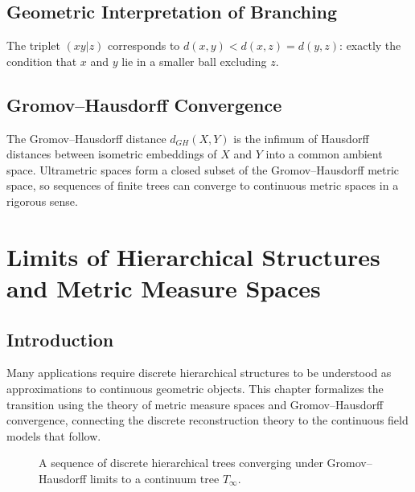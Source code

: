 \documentclass[12pt,a4paper,oneside]{book}
\numberwithin{equation}{chapter}
\theoremstyle{plain}
\theoremstyle{definition}
\theoremstyle{remark}
\begin{document}
\section{Geometric Interpretation of Branching}

The triplet $(xy|z)$ corresponds to $d(x,y) < d(x,z) = d(y,z)$:
exactly the condition that $x$ and $y$ lie in a smaller ball
excluding $z$.

\section{Gromov--Hausdorff Convergence}

The Gromov--Hausdorff distance $d_{GH}(X,Y)$ is the infimum of
Hausdorff distances between isometric embeddings of $X$ and $Y$ into
a common ambient space. Ultrametric spaces form a closed subset of
the Gromov--Hausdorff metric space, so sequences of finite trees can
converge to continuous metric spaces in a rigorous sense.


\chapter[Limits of Hierarchies and Metric Measure Spaces]{Limits of Hierarchical Structures and Metric Measure Spaces}
\label{ch:metric-measure}

\section{Introduction}

Many applications require discrete hierarchical structures to be
understood as approximations to continuous geometric objects. This
chapter formalizes the transition using the theory of metric measure
spaces and Gromov--Hausdorff convergence, connecting the discrete
reconstruction theory to the continuous field models that follow.

\begin{figure}[htbp]
\centering
{}
\caption{A sequence of discrete hierarchical trees converging under
Gromov--Hausdorff limits to a continuum tree $T_\infty$.}
\label{fig:gh-convergence}
\end{figure}
\end{document}
